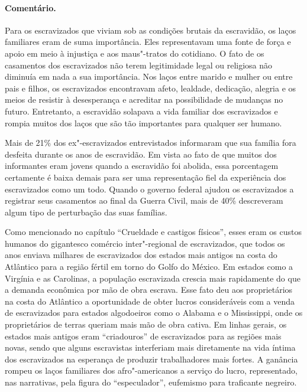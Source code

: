 \paragraph{Comentário.}\quad
{\small
Para os escravizados que viviam sob as condições brutais da
escravidão, os laços familiares eram de suma importância. Eles
representavam uma fonte de força e apoio em meio à injustiça e aos
maus"-tratos do cotidiano. O fato de os casamentos dos escravizados não terem
legitimidade legal ou religiosa não diminuía em nada a sua importância.
Nos laços entre marido e mulher ou entre pais e filhos, os escravizados
encontravam afeto, lealdade, dedicação, alegria e os meios de resistir à
desesperança e acreditar na possibilidade de mudanças no futuro.
Entretanto, a escravidão solapava a vida familiar dos escravizados e rompia
muitos dos laços que são tão importantes para qualquer ser humano.

Mais de 21\% dos ex"-escravizados entrevistados informaram que sua
família fora desfeita durante os anos de escravidão. Em vista ao fato de
que muitos dos informantes eram jovens quando a escravidão foi abolida,
essa porcentagem certamente é baixa demais para ser uma representação
fiel da experiência dos escravizados como um todo. Quando o governo federal
ajudou os escravizados a registrar seus casamentos ao final da Guerra Civil,
mais de 40\% descreveram algum tipo de perturbação das suas famílias. 

Como mencionado no capítulo ``Crueldade e castigos físicos'', esses eram os custos humanos do gigantesco comércio inter"-regional de escravizados, que todos os anos
enviava milhares de escravizados dos estados mais antigos na costa do
Atlântico para a região fértil em torno do Golfo do México. Em estados
como a Virgínia e as Carolinas, a população escravizada crescia mais
rapidamente do que a demanda econômica por mão de obra escrava. Esse
fato deu aos proprietários na costa do Atlântico a oportunidade de obter
lucros consideráveis com a venda de escravizados para estados algodoeiros
como o Alabama e o Mississippi, onde os proprietários de terras queriam
mais mão de obra cativa. Em linhas gerais, os estados mais antigos eram
``criadouros'' de escravizados para as regiões mais novas, sendo que alguns
escravistas interferiam mais diretamente na vida íntima dos escravizados na
esperança de produzir trabalhadores mais fortes. A ganância rompeu os
laços familiares dos afro"-americanos a serviço do lucro, representado,
nas narrativas, pela figura do ``especulador'', eufemismo para
traficante negreiro.

}
